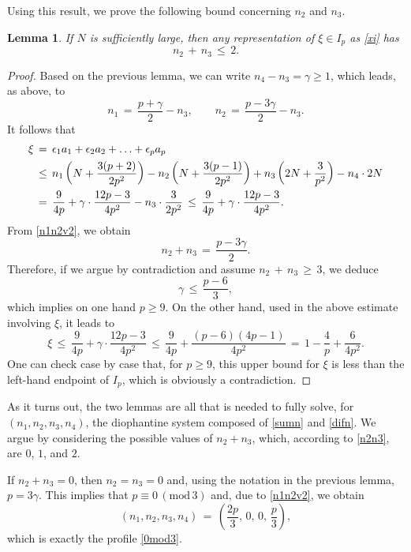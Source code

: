 \documentclass{amsart}
\newtheorem{lemma}[theorem]{Lemma}
\begin{document}
Using this result, we prove the following bound concerning $n_2$ and $n_3$.

\begin{lemma}
If $N$ is sufficiently large, then any representation of $\xi\in I_p$ as \eqref{xi} has
\begin{equation}
n_2\,+\,n_3\,\leq\, 2.
\label{n2n3}
\end{equation}
\end{lemma} 

\begin{proof}
Based on the previous lemma, we can write $n_4-n_3=\gamma\geq 1$, which leads, as above, to
\begin{equation}
n_1\,=\,\frac{p+\gamma}{2} - n_3, \qquad n_2\,=\,\frac{p-3\gamma}{2} - n_3.
\label{n1n2v2}
\end{equation}
It follows that
\[
\aligned
\xi\,&=\,  \epsilon_1 a_1+\epsilon_2 a_2+ \ldots+\epsilon_p a_p\\ 
&\leq\, n_1\left(N+ \frac{3(p+2)}{2p^2}\right) - n_2 \left(N+\frac{3(p-1)}{2p^2}\right) + n_3\left(2N +\frac{3}{p^2}\right) - n_4\cdot 2N\\
&=\,\frac{9}{4p} + \gamma \cdot \frac{12p-3}{4p^2} - n_3\cdot \frac{3}{2p^2}\,\leq\,\frac{9}{4p} + \gamma \cdot \frac{12p-3}{4p^2}.\endaligned
\]
From \eqref{n1n2v2}, we obtain
\[
n_2+n_3\,=\,\frac{p-3\gamma}{2}.\]
Therefore, if we argue by contradiction and assume $n_2\,+\,n_3\,\geq\, 3$, we deduce
\[
\gamma \,\leq\, \frac{p-6}{3},
\]
which implies on one hand $p\geq 9$. On the other hand, used in the above estimate involving $\xi$, it leads to 
\[
\xi\,\leq\, \frac{9}{4p} + \gamma \cdot \frac{12p-3}{4p^2}\,\leq\,\frac{9}{4p} +  \frac{(p-6)(4p-1)}{4p^2}\,=\, 1-\frac{4}{p}+\frac{6}{4p^2}.\] 
One can check case by case that, for $p\geq 9$, this upper bound for $\xi$ is less than the left-hand endpoint of $I_p$, which is obviously a contradiction. 
\end{proof}

As it turns out, the two lemmas are all that is needed to fully solve, for $(n_1, n_2, n_3, n_4)$, the diophantine system composed of \eqref{sumn} and \eqref{difn}. We argue by considering the possible values of $n_2+n_3$, which, according to \eqref{n2n3}, are $0$, $1$, and $2$.

If $n_2+n_3=0$, then $n_2=n_3=0$ and, using the notation in the previous lemma, $p=3\gamma$. This implies that $ p\equiv 0\, (\text{mod}\,3)$ and, due to \eqref{n1n2v2}, we obtain
\[
(n_1,n_2,n_3,n_4)\,=\,\left(\frac{2p}{3},\,0,\,0,\,\frac{p}{3}\right),
\]
which is exactly the profile \eqref{0mod3}.
\end{document}
